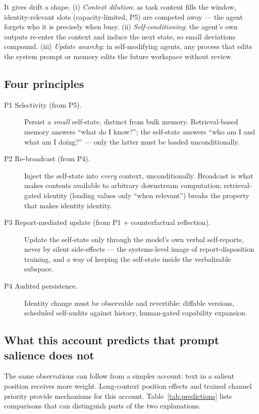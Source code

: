 \documentclass{article}
\begin{document}
It gives drift a shape. (i) \emph{Context dilution}: as task content fills the window, identity-relevant slots (capacity-limited, P5) are competed away --- the agent forgets who it is precisely when busy. (ii) \emph{Self-conditioning}: the agent's own outputs re-enter the context and induce the next state, so small deviations compound. (iii) \emph{Update anarchy}: in self-modifying agents, any process that edits the system prompt or memory edits the future workspace without review.

\subsection{Four principles}
\begin{description}
\item[P1 Selectivity (from P5).] Persist a \emph{small} self-state, distinct from bulk memory. Retrieval-based memory answers ``what do I know?''; the self-state answers ``who am I and what am I doing?'' --- only the latter must be loaded unconditionally.
\item[P2 Re-broadcast (from P4).] Inject the self-state into \emph{every} context, unconditionally. Broadcast is what makes contents available to arbitrary downstream computation; retrieval-gated identity (loading values only ``when relevant'') breaks the property that makes identity identity.
\item[P3 Report-mediated update (from P1 + counterfactual reflection).] Update the self-state only through the model's own verbal self-reports, never by silent side-effects --- the systems-level image of report-disposition training, and a way of keeping the self-state inside the verbalizable subspace.
\item[P4 Audited persistence.] Identity change must be observable and revertible: diffable versions, scheduled self-audits against history, human-gated capability expansion.
\end{description}

\subsection{What this account predicts that prompt salience does not}
\label{sec:predictions}
The same observations can follow from a simpler account: text in a salient position receives more weight. Long-context position effects \citep{liu2024lost} and trained channel priority \citep{wallace2024hierarchy} provide mechanisms for this account. Table~\ref{tab:predictions} lists comparisons that can distinguish parts of the two explanations.
\end{document}
